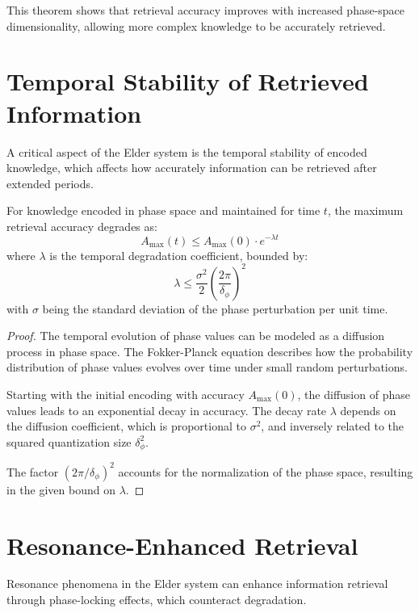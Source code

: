 This theorem shows that retrieval accuracy improves with increased phase-space dimensionality, allowing more complex knowledge to be accurately retrieved.

\section{Temporal Stability of Retrieved Information}

A critical aspect of the Elder system is the temporal stability of encoded knowledge, which affects how accurately information can be retrieved after extended periods.

\begin{theorem}
For knowledge encoded in phase space and maintained for time $t$, the maximum retrieval accuracy degrades as:
\begin{equation}
A_{\max}(t) \leq A_{\max}(0) \cdot e^{-\lambda t}
\end{equation}
where $\lambda$ is the temporal degradation coefficient, bounded by:
\begin{equation}
\lambda \leq \frac{\sigma^2}{2}\left(\frac{2\pi}{\delta_\phi}\right)^2
\end{equation}
with $\sigma$ being the standard deviation of the phase perturbation per unit time.
\end{theorem}

\begin{proof}
The temporal evolution of phase values can be modeled as a diffusion process in phase space. The Fokker-Planck equation describes how the probability distribution of phase values evolves over time under small random perturbations.

Starting with the initial encoding with accuracy $A_{\max}(0)$, the diffusion of phase values leads to an exponential decay in accuracy. The decay rate $\lambda$ depends on the diffusion coefficient, which is proportional to $\sigma^2$, and inversely related to the squared quantization size $\delta_\phi^2$.

The factor $(2\pi/\delta_\phi)^2$ accounts for the normalization of the phase space, resulting in the given bound on $\lambda$.
\end{proof}

\section{Resonance-Enhanced Retrieval}

Resonance phenomena in the Elder system can enhance information retrieval through phase-locking effects, which counteract degradation.

